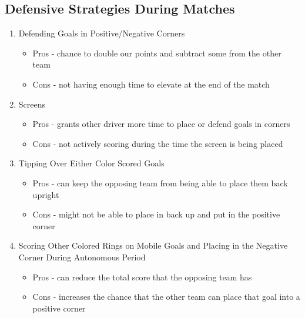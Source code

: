 \subsection{Defensive Strategies During Matches}

\begin{enumerate} 

    \item Defending Goals in Positive/Negative Corners
    \begin{itemize}
    \item Pros
    \subitem - chance to double our points and subtract some from the other team
    \item Cons
    \subitem - not having enough time to elevate at the end of the match
    \end{itemize}
    \item Screens
    
    \begin{itemize}
    \item Pros
    \subitem - grants other driver more time to place or defend goals in corners
    \item Cons
    \subitem - not actively scoring during the time the screen is being placed
    \end{itemize}
    \item Tipping Over Either Color Scored Goals
    
    \begin{itemize}
    \item Pros
    \subitem - can keep the opposing team from being able to place them back upright 
    \item Cons
    \subitem - might not be able to place in back up and put in the positive corner
    \end{itemize}
    \item Scoring Other Colored Rings on Mobile Goals and Placing in the Negative Corner During Autonomous Period
    
    \begin{itemize}
    \item Pros 
    \subitem - can reduce the total score that the opposing team has
    \item Cons
    \subitem - increases the chance that the other team can place that goal into a positive corner 
    \end{itemize}
    
\end{enumerate}


